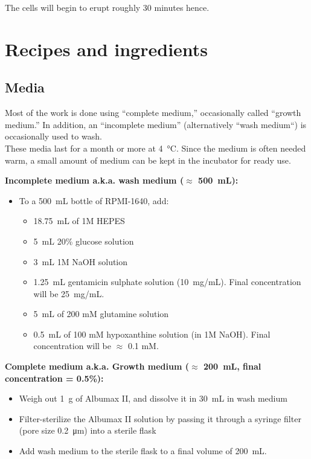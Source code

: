 \documentclass{article}
\begin{document}
The cells will begin to erupt roughly 30 minutes hence.

\section{Recipes and ingredients}

\subsection{Media}

Most of the work is done using ``complete medium,'' occasionally called ``growth medium.'' In addition, an ``incomplete medium'' (alternatively ``wash medium``) is occasionally used to wash.\\

These media last for a month or more at \SI{4}{\celsius}. Since the medium is often needed warm, a small amount of medium can be kept in the incubator for ready use.

\textbf{Incomplete medium a.k.a. wash medium ($\approx$ \SI{500}{mL}):}

\begin{itemize}
	\item To a \SI{500}{mL} bottle of RPMI-1640, add:
	\begin{itemize}
		\item \SI{18.75}{\milli\liter} of 1M HEPES
		\item \SI{5}{\milli\liter} 20\% glucose solution
		\item \SI{3}{\milli\liter} 1M NaOH solution
		\item \SI{1.25}{\milli\liter} gentamicin sulphate solution (\SI{10}{mg/mL}). Final concentration will be \SI{25}{mg/mL}.
		\item \SI{5}{\milli\liter} of 200 mM glutamine solution
		\item \SI{0.5}{\milli\liter} of 100 mM hypoxanthine solution (in 1M NaOH). Final concentration will be $\approx$ 0.1 mM.
	\end{itemize}
\end{itemize}
	
\textbf{Complete medium a.k.a. Growth medium ($\approx$ \SI{200}{mL}, final concentration = 0.5\%):}

\begin{itemize}
	\item Weigh out \SI{1}{g} of Albumax II, and dissolve it in \SI{30}{mL} in wash medium
	\item Filter-sterilize the Albumax II solution by passing it through a syringe filter (pore size \SI{0.2}{\micro\meter}) into a sterile flask
	\item Add wash medium to the sterile flask to a final volume of \SI{200}{mL}.
\end{itemize}
\end{document}
